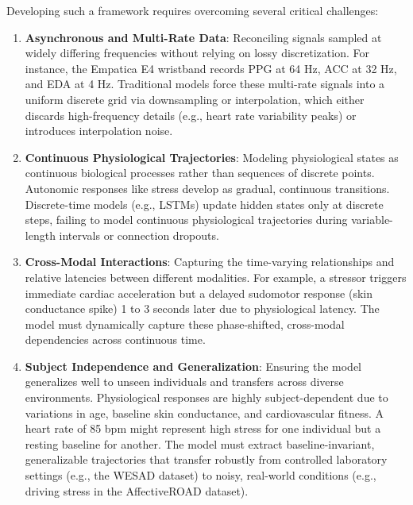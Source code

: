 \documentclass[12pt, a4paper]{report}
\numberwithin{equation}{chapter}
\begin{document}
Developing such a framework requires overcoming several critical challenges:
\begin{enumerate}
    \item \textbf{Asynchronous and Multi-Rate Data}: Reconciling signals sampled at widely differing frequencies without relying on lossy discretization. For instance, the Empatica E4 wristband records PPG at 64 Hz, ACC at 32 Hz, and EDA at 4 Hz. Traditional models force these multi-rate signals into a uniform discrete grid via downsampling or interpolation, which either discards high-frequency details (e.g., heart rate variability peaks) or introduces interpolation noise.
    \item \textbf{Continuous Physiological Trajectories}: Modeling physiological states as continuous biological processes rather than sequences of discrete points. Autonomic responses like stress develop as gradual, continuous transitions. Discrete-time models (e.g., LSTMs) update hidden states only at discrete steps, failing to model continuous physiological trajectories during variable-length intervals or connection dropouts.
    \item \textbf{Cross-Modal Interactions}: Capturing the time-varying relationships and relative latencies between different modalities. For example, a stressor triggers immediate cardiac acceleration but a delayed sudomotor response (skin conductance spike) 1 to 3 seconds later due to physiological latency. The model must dynamically capture these phase-shifted, cross-modal dependencies across continuous time.
    \item \textbf{Subject Independence and Generalization}: Ensuring the model generalizes well to unseen individuals and transfers across diverse environments. Physiological responses are highly subject-dependent due to variations in age, baseline skin conductance, and cardiovascular fitness. A heart rate of 85 bpm might represent high stress for one individual but a resting baseline for another. The model must extract baseline-invariant, generalizable trajectories that transfer robustly from controlled laboratory settings (e.g., the WESAD dataset) to noisy, real-world conditions (e.g., driving stress in the AffectiveROAD dataset).
\end{enumerate}
\end{document}
